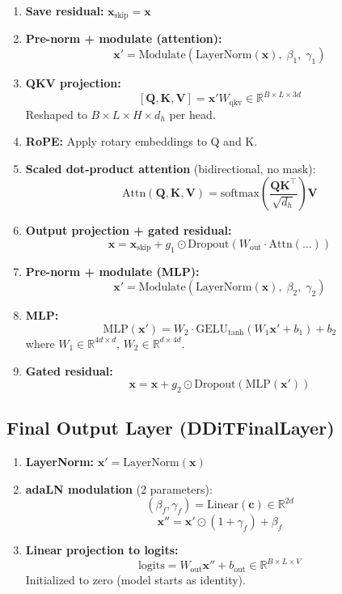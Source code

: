 \documentclass[11pt,a4paper]{article}
\begin{document}
\begin{enumerate}
    \item \textbf{Save residual:} $\mathbf{x}_{\text{skip}} = \mathbf{x}$
    
    \item \textbf{Pre-norm + modulate (attention):}
    \[
    \mathbf{x}' = \text{Modulate}\!\left(\text{LayerNorm}(\mathbf{x}),\; \beta_1,\; \gamma_1\right)
    \]
    
    \item \textbf{QKV projection:}
    \[
    [\mathbf{Q}, \mathbf{K}, \mathbf{V}] = \mathbf{x}' W_{\text{qkv}} \in \mathbb{R}^{B \times L \times 3d}
    \]
    Reshaped to $B \times L \times H \times d_h$ per head.
    
    \item \textbf{RoPE:} Apply rotary embeddings to Q and K.
    
    \item \textbf{Scaled dot-product attention} (bidirectional, no mask):
    \[
    \text{Attn}(\mathbf{Q}, \mathbf{K}, \mathbf{V}) = \text{softmax}\!\left(\frac{\mathbf{Q}\mathbf{K}^\top}{\sqrt{d_h}}\right) \mathbf{V}
    \]
    
    \item \textbf{Output projection + gated residual:}
    \[
    \mathbf{x} = \mathbf{x}_{\text{skip}} + g_1 \odot \text{Dropout}\!\left(W_{\text{out}} \cdot \text{Attn}(\ldots)\right)
    \]
    
    \item \textbf{Pre-norm + modulate (MLP):}
    \[
    \mathbf{x}' = \text{Modulate}\!\left(\text{LayerNorm}(\mathbf{x}),\; \beta_2,\; \gamma_2\right)
    \]
    
    \item \textbf{MLP:}
    \[
    \text{MLP}(\mathbf{x}') = W_2 \cdot \text{GELU}_{\text{tanh}}(W_1 \mathbf{x}' + b_1) + b_2
    \]
    where $W_1 \in \mathbb{R}^{4d \times d}$, $W_2 \in \mathbb{R}^{d \times 4d}$.
    
    \item \textbf{Gated residual:}
    \[
    \mathbf{x} = \mathbf{x} + g_2 \odot \text{Dropout}\!\left(\text{MLP}(\mathbf{x}')\right)
    \]
\end{enumerate}

\subsection{Final Output Layer (DDiTFinalLayer)}

\begin{enumerate}
    \item \textbf{LayerNorm:} $\mathbf{x}' = \text{LayerNorm}(\mathbf{x})$
    \item \textbf{adaLN modulation} (2 parameters):
    \[
    (\beta_f, \gamma_f) = \text{Linear}(\mathbf{c}) \in \mathbb{R}^{2d}
    \]
    \[
    \mathbf{x}'' = \mathbf{x}' \odot (1 + \gamma_f) + \beta_f
    \]
    \item \textbf{Linear projection to logits:}
    \[
    \text{logits} = W_{\text{out}} \mathbf{x}'' + b_{\text{out}} \in \mathbb{R}^{B \times L \times V}
    \]
    Initialized to zero (model starts as identity).
\end{enumerate}
\end{document}
